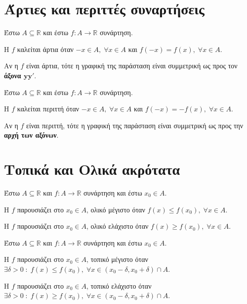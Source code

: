 \documentclass[a4paper,table]{report}
\begin{document}
\section{Άρτιες και περιττές συναρτήσεις}

\begin{dfn}
  Έστω $ A \subseteq \mathbb{R} $ και έστω $ f \colon A \to \mathbb{R} $ συνάρτηση. 
\item Η $f$ καλείται \textcolor{Col1}{άρτια} όταν $ -x \in A, \; \forall x \in A $ και $ f(-x) = f(x), \;
  \forall x \in A $.
\end{dfn}

\begin{rem}
  Αν η $f$ είναι άρτια, τότε η γραφική της παράσταση είναι συμμετρική ως προς τον
  \textbf{άξονα $\mathbf{yy'}$}.
\end{rem}

\begin{dfn}
  Έστω $ A \subseteq \mathbb{R} $ και έστω $ f \colon A \to \mathbb{R} $ συνάρτηση. 
\item Η $f$ καλείται \textcolor{Col1}{περιττή} όταν $ -x \in A, \; \forall x \in A $ και $ f(-x) = -f(x), \;
  \forall x \in A $.
\end{dfn}

\begin{rem}
  Αν η $f$ είναι περιττή, τότε η γραφική της παράσταση είναι συμμετρική ως προς την 
  \textbf{αρχή των αξόνων}.
\end{rem}

\section{Τοπικά και Ολικά ακρότατα}

\begin{dfn}
  Έστω $ A \subseteq \mathbb{R} $ και $ f \colon A \to \mathbb{R} $ συνάρτηση και 
  έστω $ x_{0} \in A $.
  \begin{myitemize}
  \item Η $f$ παρουσιάζει στο $ x_{0} \in A $, \textcolor{Col1}{ολικό μέγιστο} όταν $ f(x) \leq
      f(x_{0}), \; \forall x \in A $.
    \item Η $f$ παρουσιάζει στο $ x_{0} \in A $, \textcolor{Col1}{ολικό ελάχιστο} όταν $ f(x) \geq
      f(x_{0}), \; \forall x \in A $.
  \end{myitemize}
\end{dfn}

\begin{dfn}
  Έστω $ A \subseteq \mathbb{R} $ και $ f \colon A \to \mathbb{R} $ συνάρτηση και 
  έστω $ x_{0} \in A $.
  \begin{myitemize}
    \item Η $f$ παρουσιάζει στο $ x_{0} \in A $, \textcolor{Col1}{τοπικό μέγιστο} όταν $ \exists \delta >
      0 \; : \; f(x) \leq f(x_{0}), \; \forall x \in (x_{0}- \delta , x_{0}+ \delta)
      \cap A  $.
    \item Η $f$ παρουσιάζει στο $ x_{0} \in A $, \textcolor{Col1}{τοπικό ελάχιστο} όταν $ \exists \delta >
      0 \; : \; f(x) \geq f(x_{0}), \; \forall x \in (x_{0}- \delta , x_{0}+ \delta)
      \cap A  $.
  \end{myitemize}
\end{dfn}
\end{document}
